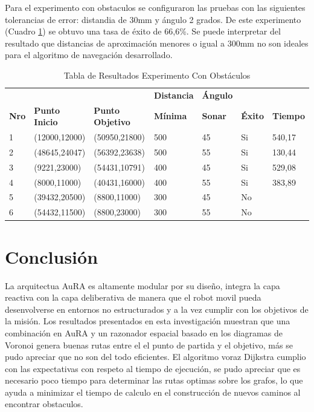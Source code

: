 \documentclass[11pt,twoside,A5]{article}
\newcommand{\reftable}[1]{Cuadro \ref{#1}}
\begin{document}
Para el experimento con obstaculos se configuraron las pruebas con 
las siguientes tolerancias de error: distandia de 30mm y ángulo 2 grados.
De este experimento (\reftable{tab:experimento-2}) se obtuvo una tasa de éxito de 66,6\%. Se puede interpretar del resultado
que distancias de aproximación menores o igual a 300mm no son ideales para el algoritmo de navegación desarrollado.

\begin{table}[h]
\centering
\caption{Tabla de Resultados Experimento Con Obstáculos}
\label{tab:experimento-2}
\tiny
\begin{tabular}{|l|l|l|l|l|l|l|} \hline
&&&\textbf{Distancia}&\textbf{Ángulo}&& \\ 
\textbf{Nro}&\textbf{Punto Inicio}&\textbf{Punto Objetivo}&\textbf{Mínima}&\textbf{Sonar}&\textbf{Éxito}&\textbf{Tiempo} \\ \hline
1&(12000,12000)&(50950,21800)&500&45&Si&540,17 \\ \hline
2&(48645,24047)&(56392,23638)&500&55&Si&130,44 \\ \hline
3&(9221,23000)&(54431,10791)&400&45&Si&529,08 \\ \hline
4&(8000,11000)&(40431,16000)&400&55&Si&383,89 \\ \hline
5&(39432,20500)&(8800,11000)&300&45&No&\\ \hline
6&(54432,11500)&(8800,23000)&300&55&No&\\ \hline
\end{tabular}
\end{table}

\section*{Conclusión}

La arquitectua AuRA es altamente modular por su diseño, integra la capa reactiva con 
la capa deliberativa de manera que el robot movil pueda desenvolverse en 
entornos no estructurados y a la vez cumplir con los objetivos de la misión. Los resultados
presentados en esta investigación muestran que una combinación en AuRA y
un razonador espacial basado en los diagramas de Voronoi genera buenas rutas entre el 
el punto de partida y el objetivo, más se pudo apreciar que no son del todo eficientes.
El algoritmo voraz Dijkstra  cumplio con las expectativas con respeto al 
tiempo de ejecución, se pudo apreciar que es necesario poco tiempo para determinar
las rutas optimas sobre los grafos, lo que ayuda 
a minimizar el tiempo de calculo en el construcción
de nuevos caminos al encontrar obstaculos.
\end{document}
